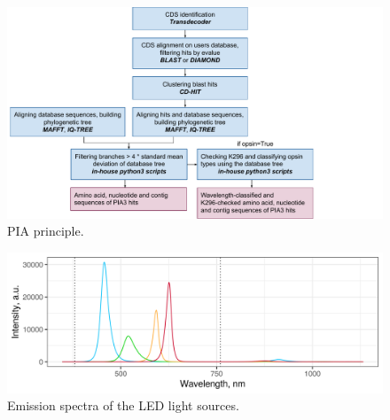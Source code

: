 \documentclass{article}
\begin{document}
\begin{figure}[H] 
	\includegraphics[width=\linewidth]{./FigS6_PIA3.pdf}
	\caption{PIA principle.} \end{figure}


\begin{figure}[H] %
	\includegraphics[width=\linewidth]{./FigS7_spectra.png}%
	\caption{Emission spectra of the LED light sources.} \end{figure}

	
\end{document}
